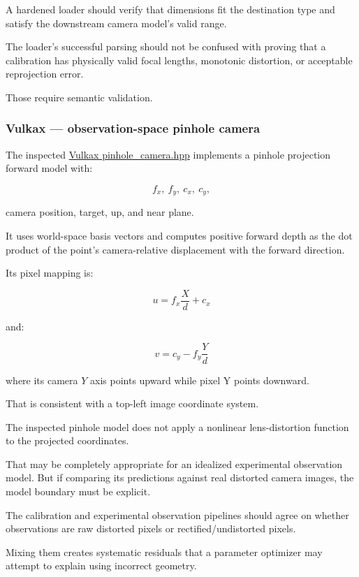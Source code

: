 A hardened loader should verify that dimensions fit the destination type and satisfy the downstream camera model's valid range.

The loader's successful parsing should not be confused with proving that a calibration has physically valid focal lengths, monotonic distortion, or acceptable reprojection error.

Those require semantic validation.

\subsubsection{Vulkax --- observation-space pinhole camera}\label{02-foundations-ii-ch037-vulkax-observation-space-pinhole-camera}

The inspected \href{https://github.com/swayam8624/Vulkax/blob/main/include/vulkax/world/pinhole_camera.hpp?utm_source=chatgpt.com}{Vulkax pinhole\_camera.hpp} implements a pinhole projection forward model with:

\[
 f_x,\ f_y,\ c_x,\ c_y,
\]

camera position, target, up, and near plane.

It uses world-space basis vectors and computes positive forward depth as the dot product of the point's camera-relative displacement with the forward direction.

Its pixel mapping is:

\[
 \boxed{ u=f_x\frac{X}{d}+c_x }
\]

and:

\[
 \boxed{ v=c_y-f_y\frac{Y}{d} }
\]

where its camera \(Y\) axis points upward while pixel Y points downward.

That is consistent with a top-left image coordinate system.

The inspected pinhole model does not apply a nonlinear lens-distortion function to the projected coordinates.

That may be completely appropriate for an idealized experimental observation model. But if comparing its predictions against real distorted camera images, the model boundary must be explicit.

The calibration and experimental observation pipelines should agree on whether observations are raw distorted pixels or rectified/undistorted pixels.

Mixing them creates systematic residuals that a parameter optimizer may attempt to explain using incorrect geometry.

